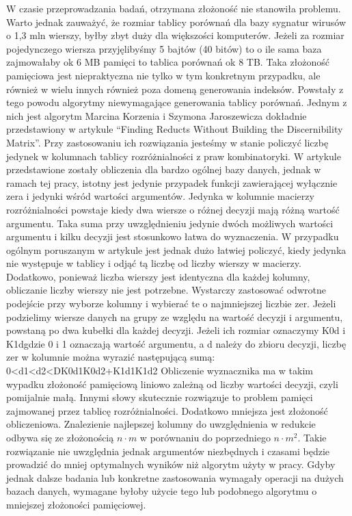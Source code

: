 W czasie przeprowadzania badań, otrzymana złożoność nie stanowiła problemu.
Warto jednak zauważyć, że rozmiar tablicy porównań dla bazy sygnatur wirusów o 1,3 mln wierszy, byłby zbyt duży dla większości komputerów.
Jeżeli za rozmiar pojedynczego wiersza przyjęlibyśmy 5 bajtów (40 bitów) to o ile sama baza zajmowałaby ok 6 MB pamięci to tablica porównań ok 8 TB.
Taka złożoność pamięciowa jest niepraktyczna nie tylko w tym konkretnym przypadku, ale również w wielu innych również poza domeną generowania indeksów.
Powstały z tego powodu algorytmy niewymagające generowania tablicy porównań.
Jednym z nich jest algorytm Marcina Korzenia i Szymona Jaroszewicza dokładnie przedstawiony w artykule “Finding Reducts Without Building the Discernibility Matrix”.
Przy zastosowaniu ich rozwiązania jesteśmy w stanie policzyć liczbę jedynek w kolumnach tablicy rozróżnialności z praw kombinatoryki.
W artykule przedstawione zostały obliczenia dla bardzo ogólnej bazy danych, jednak w ramach tej pracy, istotny jest jedynie przypadek funkcji zawierającej wyłącznie zera i jedynki wśród wartości argumentów.
Jedynka w kolumnie macierzy rozróżnialności powstaje kiedy dwa wiersze o różnej decyzji mają różną wartość argumentu.
Taka suma przy uwzględnieniu jedynie dwóch możliwych wartości argumentu i kilku decyzji jest stosunkowo łatwa do wyznaczenia.
W przypadku ogólnym poruszanym w artykule jest jednak dużo łatwiej policzyć, kiedy jedynka nie występuje w tablicy i odjąć tą liczbę od liczby wierszy w macierzy.
Dodatkowo, ponieważ liczba wierszy jest identyczna dla każdej kolumny, obliczanie liczby wierszy nie jest potrzebne.
Wystarczy zastosować odwrotne podejście przy wyborze kolumny i wybierać te o najmniejszej liczbie zer.
Jeżeli podzielimy wiersze danych na grupy ze względu na wartość decyzji i argumentu, powstaną po dwa kubełki dla każdej decyzji.
Jeżeli ich rozmiar oznaczymy K0d i K1dgdzie 0 i 1 oznaczają wartość argumentu, a d należy do zbioru decyzji, liczbę zer w kolumnie można wyrazić następującą sumą:
0<d1<d2<DK0d1K0d2+K1d1K1d2
Obliczenie wyznacznika ma w takim wypadku złożoność pamięciową liniowo zależną od liczby wartości decyzji, czyli pomijalnie małą.
Innymi słowy skutecznie rozwiązuje to problem pamięci zajmowanej przez tablicę rozróżnialności.
Dodatkowo mniejsza jest złożoność obliczeniowa.
Znalezienie najlepszej kolumny do uwzględnienia w redukcie odbywa się ze złożonością $n \cdot m$ w porównaniu do poprzedniego $n \cdot m^2$.
Takie rozwiązanie nie uwzględnia jednak argumentów niezbędnych i czasami będzie prowadzić do mniej optymalnych wyników niż algorytm użyty w pracy.
Gdyby jednak dalsze badania lub konkretne zastosowania wymagały operacji na dużych bazach danych, wymagane byłoby użycie tego lub podobnego algorytmu o mniejszej złożoności pamięciowej.

